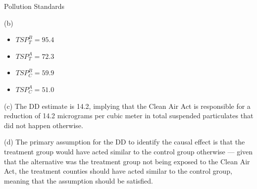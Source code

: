 \documentclass[10pt]{extarticle}
\begin{document}
\begin{problem}{Pollution Standards}
\begin{problem}{(b)}
      \begin{itemize}
        \item $TSP_{T}^{B} = 95.4$
        \item $TSP_{T}^{A} = 72.3$
        \item $TSP_{C}^{B} = 59.9$
        \item $TSP_{C}^{A} = 51.0$
      \end{itemize}
    \end{problem}
    \begin{problem}{(c)}
      The DD estimate is 14.2, implying that the Clean Air Act is responsible for a reduction of 14.2 micrograms per cubic meter in total suspended particulates that did not happen otherwise.
    \end{problem}
    \begin{problem}{(d)}
      The primary assumption for the DD to identify the causal effect is that the treatment group would have acted similar to the control group otherwise --- given that the alternative was the treatment group not being exposed to the Clean Air Act, the treatment counties should have acted similar to the control group, meaning that the assumption should be satisfied.
    \end{problem}
  \end{problem}
\end{document}

